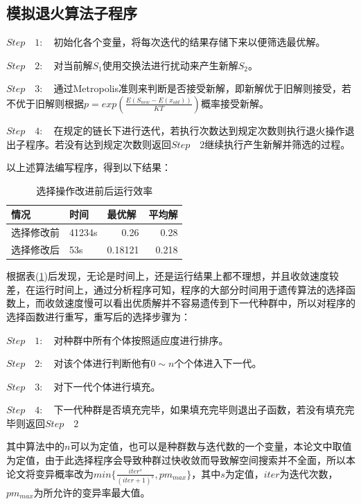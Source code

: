 \subsection{模拟退火算法子程序}
\label{sa-zcx}%
\par
$Step \quad 1: \quad $初始化各个变量，将每次迭代的结果存储下来以便筛选最优解。
\par
$Step \quad 2: \quad $对当前解$S_1$使用交换法进行扰动来产生新解$S_2$。
\par
$Step \quad 3: \quad $通过Metropolis准则来判断是否接受新解，即新解优于旧解则接受，若不优于旧解则根据$p = exp(\frac{E(S_{new}-E(x_{old}))}{KT})$概率接受新解。
\par
$Step \quad 4: \quad $在规定的链长下进行迭代，若执行次数达到规定次数则执行退火操作退出子程序。若没有达到规定次数则返回$Step \quad 2$继续执行产生新解并筛选的过程。
\par
以上述算法编写程序，得到以下结果：
\begin{table}[htbp]
    \centering
    \caption{选择操作改进前后运行效率}%
      \begin{tabular}{|l|l|r|r|}
      \hline 
      情况    & 时间    & \multicolumn{1}{l|}{最优解} & \multicolumn{1}{l|}{平均解} \\
      \hline 
      选择修改前 & 41234s & 0.26  & 0.28 \\
      选择修改后 & 53s   & 0.18121 & 0.218 \\
      \hline 
      \end{tabular}%
    \label{tab:xzgqgh}%
  \end{table}%
\par
根据表(\ref{tab:xzgqgh})后发现，无论是时间上，还是运行结果上都不理想，并且收敛速度较差，在运行时间上，通过分析程序可知，程序的大部分时间用于遗传算法的选择函数上，而收敛速度慢可以看出优质解并不容易遗传到下一代种群中，所以对程序的选择函数进行重写，重写后的选择步骤为：
\par
$Step \quad 1: \quad $对种群中所有个体按照适应度进行排序。
\par
$Step \quad 2: \quad $对该个体进行判断他有$0 \sim n$个个体进入下一代。
\par
$Step \quad 3: \quad $对下一代个体进行填充。
\par
$Step \quad 4: \quad $下一代种群是否填充完毕，如果填充完毕则退出子函数，若没有填充完毕则返回$Step \quad 2$
\par
其中算法中的$n$可以为定值，也可以是种群数与迭代数的一个变量，本论文中取值为定值，由于此选择程序会导致种群过快收敛而导致解空间搜索并不全面，所以本论文将变异概率改为$min\{\frac{iter^s}{(iter + 1)^s}, pm_{max}\}$，其中$s$为定值，$iter$为迭代次数，$pm_{max}$为所允许的变异率最大值。
